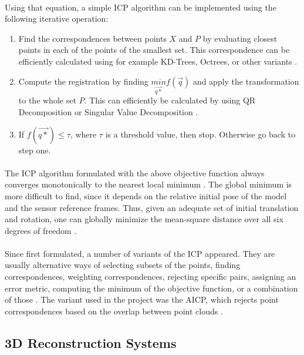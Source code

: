 \documentclass[12pt]{article}
\begin{document}
	\paragraph{}
	Using that equation, a simple ICP algorithm can be implemented using the following iterative operation:
	\begin{enumerate}[leftmargin=.8in]
		\item Find the correspondences between points $X$ and $P$ by evaluating closest points in each of the points of the smallest set. This correspondence can be efficiently calculated using for example KD-Trees, Octrees, or other variants \cite{KDT}.
		\item Compute the registration by finding $\underset{\overrightarrow{q*}}{min}f(\overrightarrow{q})$ and apply the transformation to the whole set $P$. This can efficiently be calculated by using QR Decomposition or Singular Value Decomposition \cite{ICPVariants}.
		\item If $f(\overrightarrow{q*}) \leq \tau$, where $\tau$ is a threshold value, then stop. Otherwise go back to step one.
	\end{enumerate}	
	
	\paragraph{}
	The ICP algorithm formulated with the above objective function always converges monotonically to the nearest local minimum \cite{AMethodRegistration}. The global minimum is more difficult to find, since it depends on the relative initial pose of the model and the sensor reference frames. Thus, given an adequate set of initial translation and rotation, one can globally minimize the mean-square distance over all six degrees of freedom \cite{AMethodRegistration}.

	\paragraph{}
	Since first formulated, a number of variants of the ICP appeared. They are usually alternative ways of selecting subsets of the points, finding correspondences, weighting correspondences, rejecting specific pairs, assigning an error metric, computing the minimum of the objective function, or a combination of those \cite{ICPVariants}. The variant used in the project was the AICP, which rejects point correspondences based on the overlap between point clouds \cite{7989547}.
	
	\subsection{3D Reconstruction Systems}
\end{document}
